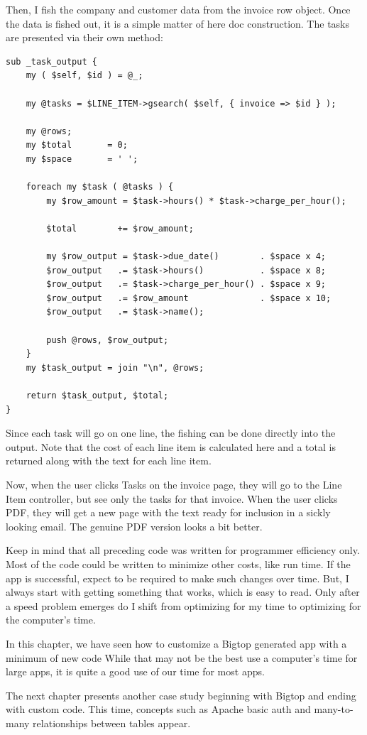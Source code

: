 Then, I fish the company and customer data from the invoice row object.
Once the data is fished out, it is a simple matter of here doc construction.
The tasks are presented via their own method:

\begin{verbatim}
sub _task_output {
    my ( $self, $id ) = @_;

    my @tasks = $LINE_ITEM->gsearch( $self, { invoice => $id } );

    my @rows;
    my $total       = 0;
    my $space       = ' ';

    foreach my $task ( @tasks ) {
        my $row_amount = $task->hours() * $task->charge_per_hour();

        $total        += $row_amount;

        my $row_output = $task->due_date()        . $space x 4;
        $row_output   .= $task->hours()           . $space x 8;
        $row_output   .= $task->charge_per_hour() . $space x 9;
        $row_output   .= $row_amount              . $space x 10;
        $row_output   .= $task->name();

        push @rows, $row_output;
    }
    my $task_output = join "\n", @rows;
    
    return $task_output, $total;
}
\end{verbatim}

Since each task will go on one line, the fishing can be done directly into
the output.  Note that the cost of each line item is calculated here and
a total is returned along with the text for each line item.

Now, when the user clicks Tasks on the invoice page, they will go to the
Line Item controller, but see only the tasks for that invoice.  When the
user clicks PDF, they will get a new page with the text ready for inclusion
in a sickly looking email.  The genuine PDF version looks a bit better.

Keep in mind that all preceding code was written for programmer efficiency
only.  Most of the code could be written to minimize other costs, like
run time.  If the app is successful, expect to be required to make such
changes over time.  But, I always start with getting something that works,
which is easy to read.  Only after a speed problem emerges do I shift from
optimizing for my time to optimizing for the computer's time.

In this chapter, we have seen how to customize a Bigtop generated app with
a minimum of new code  While that may not be the best use a computer's
time for large apps, it is quite a good use of our time for most apps.

The next chapter presents another case study beginning with Bigtop and ending
with custom code.  This time, concepts such as Apache basic auth and
many-to-many relationships between tables appear.
